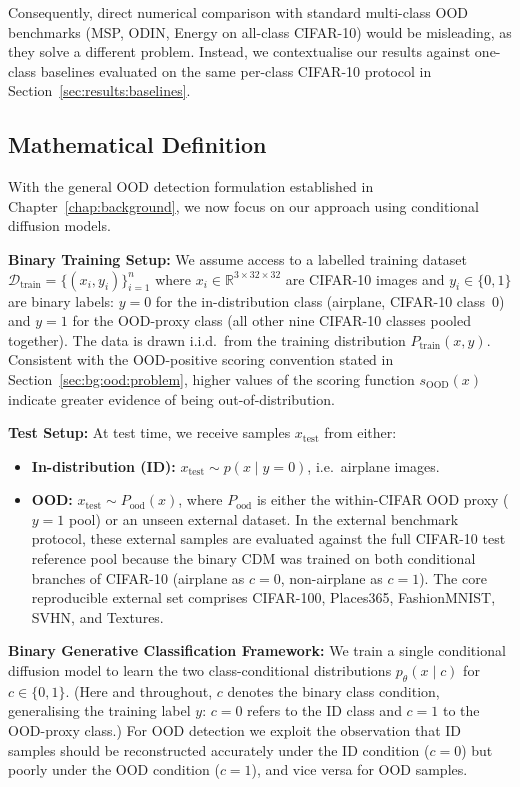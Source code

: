 Consequently, direct numerical comparison with standard multi-class OOD benchmarks (MSP, ODIN, Energy on all-class CIFAR-10) would be misleading, as they solve a different problem. Instead, we contextualise our results against one-class baselines evaluated on the same per-class CIFAR-10 protocol in Section~\ref{sec:results:baselines}.

\subsection{Mathematical Definition}
\label{sec:meth:problem:math}

With the general OOD detection formulation established in Chapter~\ref{chap:background}, we now focus on our approach using conditional diffusion models.

\textbf{Binary Training Setup:} We assume access to a labelled training dataset $\mathcal{D}_{\text{train}} = \{(x_i, y_i)\}_{i=1}^{n}$ where $x_i \in \mathbb{R}^{3 \times 32 \times 32}$ are CIFAR-10 images and $y_i \in \{0, 1\}$ are binary labels: $y = 0$ for the in-distribution class (airplane, CIFAR-10 class~0) and $y = 1$ for the OOD-proxy class (all other nine CIFAR-10 classes pooled together). The data is drawn i.i.d.\ from the training distribution $P_{\text{train}}(x, y)$. Consistent with the OOD-positive scoring convention stated in Section~\ref{sec:bg:ood:problem}, higher values of the scoring function $s_{\text{OOD}}(x)$ indicate greater evidence of being out-of-distribution.

\textbf{Test Setup:} At test time, we receive samples $x_{\text{test}}$ from either:
\begin{itemize}
    \item \textbf{In-distribution (ID):} $x_{\text{test}} \sim p(x \mid y = 0)$, i.e.\ airplane images.
\item \textbf{OOD:} $x_{\text{test}} \sim P_{\text{ood}}(x)$, where $P_{\text{ood}}$ is either the within-CIFAR OOD proxy ($y = 1$ pool) or an unseen external dataset. In the external benchmark protocol, these external samples are evaluated against the full CIFAR-10 test reference pool because the binary CDM was trained on both conditional branches of CIFAR-10 (airplane as $c{=}0$, non-airplane as $c{=}1$). The core reproducible external set comprises CIFAR-100, Places365, FashionMNIST, SVHN, and Textures.
\end{itemize}

\textbf{Binary Generative Classification Framework:} We train a single conditional diffusion model to learn the two class-conditional distributions $p_\theta(x \mid c)$ for $c \in \{0, 1\}$. (Here and throughout, $c$ denotes the binary class condition, generalising the training label $y$: $c = 0$ refers to the ID class and $c = 1$ to the OOD-proxy class.) For OOD detection we exploit the observation that ID samples should be reconstructed accurately under the ID condition ($c = 0$) but poorly under the OOD condition ($c = 1$), and vice versa for OOD samples.

